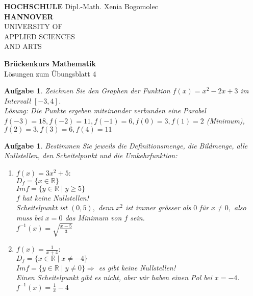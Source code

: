 \documentclass[12pt]{article}
\newtheorem{exercise}[satz]{Aufgabe}
\begin{document}
\pagestyle{empty}
\parindent 0cm
\begin{minipage}{14cm}
  \footnotesize{\textbf{HOCHSCHULE} \hfill Dipl.-Math. Xenia Bogomolec\\
  \textbf{HANNOVER}\\
    UNIVERSITY OF\\
    APPLIED SCIENCES\\
    AND ARTS
    }
\end{minipage}
\vspace{1.0cm}

\begin{center}
  {\Large \bf Br\"uckenkurs Mathematik} \\
  \vspace{0.5cm}
  {\large L\"osungen zum \"Ubungsblatt 4}  \\
\end{center}

\vspace{0.5cm}
\normalsize
\parindent0cm

\begin{exercise}
  Zeichnen Sie den Graphen der Funktion $f(x) = x^2-2x+3$ im Intervall $[-3,4]$. \\
  L\"osung: Die Punkte ergeben miteinander verbunden eine Parabel\\
  $f(-3) = 18, f(-2) = 11, f(-1) = 6, f(0) = 3, f(1) = 2$ (Minimum), $f(2) = 3, f(3) = 6, f(4) = 11$ 
\end{exercise}

\vspace{0.1cm}

\begin{exercise}
  Bestimmen Sie jeweils die Definitionsmenge, die Bildmenge, alle Nullstellen, den Scheitelpunkt und die Umkehrfunktion:
  \begin{enumerate}
    \item[(a)] $f(x) = 3x^2+5:$\\
      $D_f = \{x \in \mathbb{R}\}$\\
      $Im f = \{y \in \mathbb{R}\mid y\geq 5\}$\\
      $f$ hat keine Nullstellen!\\
      Scheitelpunkt ist $(0,5),$ denn $x^2$ ist immer gr\"osser als $0$ f\"ur $x \neq 0,$ also muss bei $x = 0 $ das Minimum von $f$ sein.\\
      $f^{-1}(x) = \sqrt{\frac{x-5}{3}}$
    \item[(b)] $f(x) = \frac{1}{x+4}:$\\
      $D_f = \{x \in \mathbb{R} \mid x \neq -4\}$\\
      $Im f = \{y \in \mathbb{R}\mid y\neq 0\} \Rightarrow$ es gibt keine Nullstellen!\\
      Einen Scheitelpunkt gibt es nicht, aber wir haben einen Pol bei $x = -4$.\\
      $f^{-1}(x) = \frac{1}{x} - 4$ 
  \end{enumerate}
\end{exercise}
\end{document}
